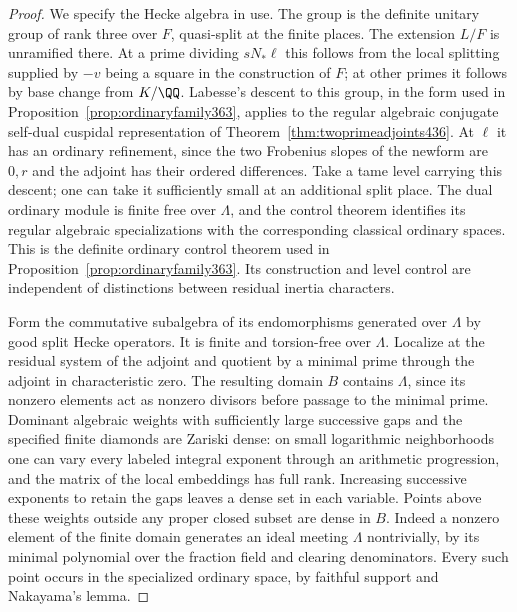 \documentclass[a4paper,11pt]{article}
\theoremstyle{definition}
\theoremstyle{remark}
\numberwithin{equation}{section}
\begin{document}
\begin{proof}
We specify the Hecke algebra in use. The group is the
definite unitary group of rank three over \(F\), quasi-split
at the finite places. The extension \(L/F\) is unramified
there. At a prime dividing \(sN_*\ell\) this follows from
the local splitting supplied by \(-v\) being a square in
the construction of \(F\); at other primes it follows by
base change from \(K/\QQ\). Labesse's descent to this group,
in the form used in Proposition~\ref{prop:ordinaryfamily363},
applies to the regular algebraic conjugate self-dual
cuspidal representation of Theorem~\ref{thm:twoprimeadjoints436}.
At \(\ell\) it has an ordinary refinement, since the two
Frobenius slopes of the newform are \(0,r\) and the adjoint
has their ordered differences. Take a tame level carrying
this descent; one can take it sufficiently small at an
additional split place. The dual ordinary module is finite
free over \(\Lambda\), and the control theorem identifies
its regular algebraic specializations with the corresponding
classical ordinary spaces. This is the definite ordinary
control theorem used in Proposition~\ref{prop:ordinaryfamily363}.
Its construction and level control are independent of
distinctions between residual inertia characters.~\cite{XI-VIII-geraghty363}

Form the commutative subalgebra of its endomorphisms generated
over \(\Lambda\) by good split Hecke operators. It is finite
and torsion-free over \(\Lambda\). Localize at the residual
system of the adjoint and quotient by a minimal prime through
the adjoint in characteristic zero. The resulting domain
\(B\) contains \(\Lambda\), since its nonzero elements act
as nonzero divisors before passage to the minimal prime.
Dominant algebraic weights with sufficiently large successive
gaps and the specified finite diamonds are Zariski dense:
on small logarithmic neighborhoods one can vary every labeled
integral exponent through an arithmetic progression, and
the matrix of the local embeddings has full rank. Increasing
successive exponents to retain the gaps leaves a dense set
in each variable. Points above these weights outside any
proper closed subset are dense in \(B\). Indeed a nonzero
element of the finite domain generates an ideal meeting
\(\Lambda\) nontrivially, by its minimal polynomial over the
fraction field and clearing denominators. Every such point
occurs in the specialized ordinary space, by faithful support
and Nakayama's lemma.


\end{proof}
\end{document}
